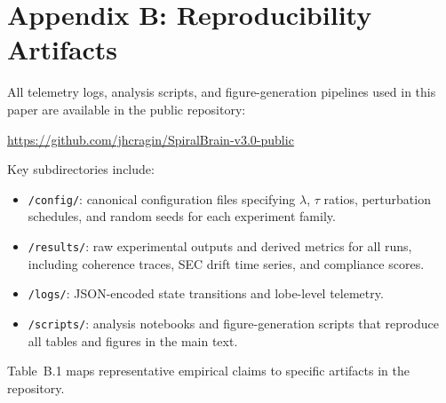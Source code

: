\documentclass[11pt,a4paper]{article}
\begin{document}
\section*{Appendix B: Reproducibility Artifacts}

All telemetry logs, analysis scripts, and figure-generation pipelines used in this paper
are available in the public repository:

\url{https://github.com/jhcragin/SpiralBrain-v3.0-public}

Key subdirectories include:

\begin{itemize}
  \item \texttt{/config/}: canonical configuration files specifying $\lambda$, $\tau$ ratios,
        perturbation schedules, and random seeds for each experiment family.
  \item \texttt{/results/}: raw experimental outputs and derived metrics for all runs,
        including coherence traces, SEC drift time series, and compliance scores.
  \item \texttt{/logs/}: JSON-encoded state transitions and lobe-level telemetry.
  \item \texttt{/scripts/}: analysis notebooks and figure-generation scripts that
        reproduce all tables and figures in the main text.
\end{itemize}

Table~B.1 maps representative empirical claims to specific artifacts in the repository.

\begin{table}[htbp]
\centering
\renewcommand{\arraystretch}{1.50}
\caption{Example mapping between empirical claims and public repository artifacts (paths illustrative).}
\end{table}
\end{document}
